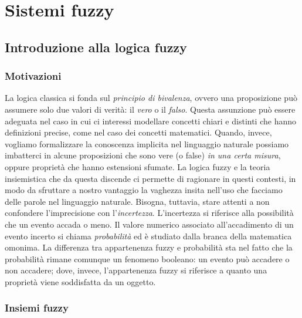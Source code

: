 \documentclass[10pt,a4paper]{article}
\begin{document}
\section{Sistemi fuzzy}

\subsection{Introduzione alla logica fuzzy}

\subsubsection{Motivazioni}

La logica classica si fonda sul \emph{principio di bivalenza}, ovvero una proposizione può assumere solo due valori di verità: il \emph{vero} o il \emph{falso}. Questa assunzione può essere adeguata nel caso in cui ci interessi modellare concetti chiari e distinti che hanno definizioni precise, come nel caso dei concetti matematici. Quando, invece, vogliamo formalizzare la conoscenza implicita nel linguaggio naturale possiamo imbatterci in alcune proposizioni che sono vere (o false) \emph{in una certa misura}, oppure proprietà che hanno estensioni sfumate. La logica fuzzy e la teoria insiemistica che da questa discende ci permette di ragionare in questi contesti, in modo da sfruttare a nostro vantaggio la vaghezza insita nell'uso che facciamo delle parole nel linguaggio naturale. Bisogna, tuttavia, stare attenti a non confondere l'imprecisione con l'\emph{incertezza}. L'incertezza si riferisce alla possibilità che un evento accada o meno. Il valore numerico associato all'accadimento di un evento incerto si chiama \emph{probabilità} ed è studiato dalla branca della matematica omonima. La differenza tra appartenenza fuzzy e probabilità sta nel fatto che la probabilità rimane comunque un fenomeno booleano: un evento può accadere o non accadere; dove, invece, l'appartenenza fuzzy si riferisce a quanto una proprietà viene soddisfatta da un oggetto. 

\subsubsection{Insiemi fuzzy}
\end{document}
